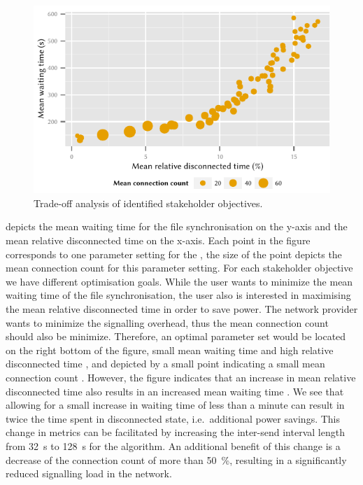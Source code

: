 \begin{figure}
  \centering
  \includegraphics{application/cloud_file_synchronization/numerical_evaluation/figures/summary}
  \caption{Trade-off analysis of identified stakeholder objectives.}
  \label{fig:application:cloud_file_synchronisation:numerical_evaluation:trade_off_analysis:summary}
\end{figure}

 depicts the mean waiting time for the file synchronisation on the y-axis and the mean relative disconnected time on the x-axis.
Each point in the figure corresponds to one parameter setting for the \algointerval, the size of the point depicts the mean connection count \connectionCount for this parameter setting.
For each stakeholder objective we have different optimisation goals.
While the user wants to minimize the mean waiting time \sojournTime of the file synchronisation, the user also is interested in maximising the mean relative disconnected time \relativeDisconnectedTime in order to save power.
The network provider wants to minimize the signalling overhead, thus the mean connection count \connectionCount should also be minimize.
Therefore, an optimal parameter set would be located on the right bottom of the figure, small mean waiting time and high relative disconnected time \relativeDisconnectedTime, and depicted by a small point indicating a small mean connection count \connectionCount.
However, the figure indicates that an increase in mean relative disconnected \relativeDisconnectedTime time also results in an increased mean waiting time \sojournTime.
We see that allowing for a small increase in waiting time \sojournTime of less than a minute can result in twice the time spent in disconnected state, i.e.\ additional power savings.
This change in metrics can be facilitated by increasing the inter-send interval length from \SI{32}{\second} to \SI{128}{\second} for the \algointerval algorithm.
An additional benefit of this change is a decrease of the connection count \relativeDisconnectedTime of more than \SI{50}{\percent}, resulting in a significantly reduced signalling load in the network.

